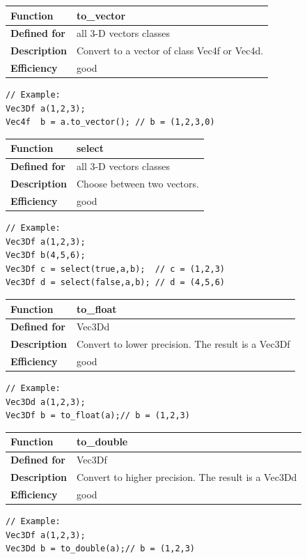 \documentclass[11pt,a4paper,oneside,openright]{report}
\newcommand{\vspacesmall}{\vspace{3mm}}
\newcommand{\vspacebig}{\vspace{6mm}}
\begin{document}
\begin{tabular}{|p{25mm}|p{100mm}|}
\hline
\bfseries Function & to\_vector \\ \hline
\bfseries Defined for & all 3-D vectors classes \\ \hline
\bfseries Description & Convert to a vector of class Vec4f or Vec4d. \\ \hline
\bfseries Efficiency & good \\ \hline
\end{tabular}
\vspacesmall

\begin{lstlisting}[frame=none]
// Example:
Vec3Df a(1,2,3);
Vec4f  b = a.to_vector(); // b = (1,2,3,0)
\end{lstlisting}
\vspacebig


\begin{tabular}{|p{25mm}|p{100mm}|}
\hline
\bfseries Function & select \\ \hline
\bfseries Defined for & all 3-D vectors classes  \\ \hline
\bfseries Description & Choose between two vectors. \\ \hline
\bfseries Efficiency & good \\ \hline
\end{tabular}
\vspacesmall

\begin{lstlisting}[frame=none]
// Example:
Vec3Df a(1,2,3);
Vec3Df b(4,5,6);
Vec3Df c = select(true,a,b);  // c = (1,2,3)
Vec3Df d = select(false,a,b); // d = (4,5,6)
\end{lstlisting}
\vspacebig


\begin{tabular}{|p{25mm}|p{100mm}|}
\hline
\bfseries Function & to\_float \\ \hline
\bfseries Defined for & Vec3Dd  \\ \hline
\bfseries Description & Convert to lower precision. The result is a Vec3Df \\ \hline
\bfseries Efficiency & good \\ \hline
\end{tabular}
\vspacesmall

\begin{lstlisting}[frame=none]
// Example:
Vec3Dd a(1,2,3);
Vec3Df b = to_float(a);// b = (1,2,3)
\end{lstlisting}
\vspacebig


\begin{tabular}{|p{25mm}|p{100mm}|}
\hline
\bfseries Function & to\_double \\ \hline
\bfseries Defined for & Vec3Df  \\ \hline
\bfseries Description & Convert to higher precision. The result is a Vec3Dd \\ \hline
\bfseries Efficiency & good \\ \hline
\end{tabular}
\vspacesmall

\begin{lstlisting}[frame=none]
// Example:
Vec3Df a(1,2,3);
Vec3Dd b = to_double(a);// b = (1,2,3)
\end{lstlisting}
\vspacebig
\end{document}
